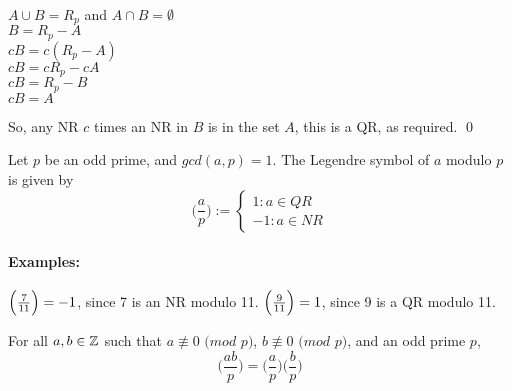 \documentclass[../main.tex]{subfiles}
\begin{document}
\begin{pf}
    \begin{center}
        $A\cup B=R_p$ and $A\cap B=\emptyset$\\
        $B=R_p-A$ \\
        $cB=c(R_p-A)$ \\
        $cB=cR_p-cA$ \\
        $cB=R_p-B$ \\
        $cB=A$
    \end{center}
    So, any NR $c$ times an NR in $B$ is in the set $A$, this is a QR, as required. \qed 
\end{pf}

\begin{defn}
    Let $p$ be an odd prime, and $gcd(a,p)=1$. The Legendre symbol of $a$ modulo $p$ is given by
    $$\bigg(\frac{a}{p}\bigg):= 
    \begin{cases} 
      1:a\in QR \\
      -1:a \in NR
   \end{cases}$$
\end{defn}

\paragraph{Examples:} $\Big(\frac{7}{11}\Big)=-1$, since 7 is an NR modulo 11. $\Big(\frac{9}{11}\Big)=1$, since 9 is a QR modulo 11.

\begin{thm}
    For all $a,b \in \mathbb{Z}$ such that $a \not\equiv 0$ $(mod$ $p)$, $b \not\equiv 0$ $(mod$ $p)$, and an odd prime $p$,
    $$\bigg(\frac{ab}{p}\bigg) = \bigg(\frac{a}{p}\bigg) \bigg(\frac{b}{p}\bigg)$$
\end{thm}
\begin{pf}
    
\end{pf}
\end{document}
